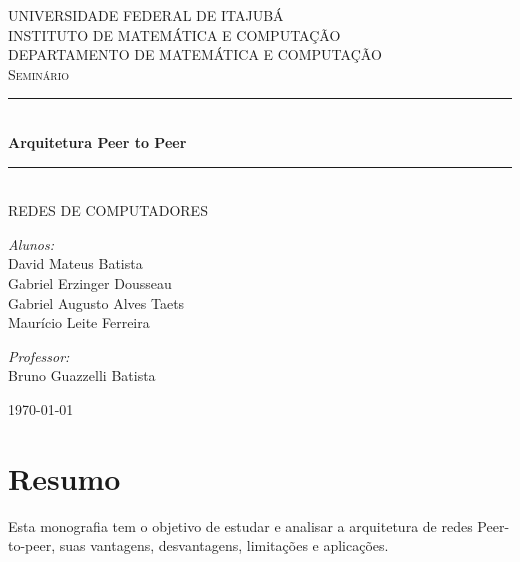 \documentclass[a4paper]{article}
\newcommand{\HRule}{\rule{\linewidth}{0.5mm}}
\newcommand{\hRule}{\rule{4.5cm}{0.1mm}}
\begin{document}
\onehalfspacing

\begin{titlepage}
\begin{center}

\textsc{\Large UNIVERSIDADE FEDERAL DE ITAJUBÁ\\
	INSTITUTO DE MATEMÁTICA E COMPUTAÇÃO}\\[0.7cm]

\textsc{DEPARTAMENTO DE MATEMÁTICA E COMPUTAÇÃO}\\[2.8cm]

\textsc{\Large Seminário}\\
\HRule \\[0.4cm]
{\Large \bfseries Arquitetura Peer to Peer}
\HRule \\[0.4cm]
\textsc{REDES DE COMPUTADORES}\\[2.8cm]

\begin{minipage}{0.4\textwidth}
\begin{flushleft} \large
\emph{Alunos:}\\[0.43cm]
David Mateus Batista\\
Gabriel Erzinger Dousseau\\
Gabriel Augusto Alves Taets\\
Maurício Leite Ferreira\\
\end{flushleft}
\end{minipage}
\begin{minipage}{0.4\textwidth}
\begin{flushright} \large
\emph{Professor:}\\[0.4cm]
Bruno Guazzelli Batista
\end{flushright}
\end{minipage}

\vfill

\today

\end{center}
\end{titlepage}

\thispagestyle{empty}

\section*{Resumo}
Esta monografia tem o objetivo de estudar e analisar a arquitetura de redes Peer-to-peer,
suas vantagens, desvantagens, limitações e aplicações.
\newpage
{}
\end{document}
